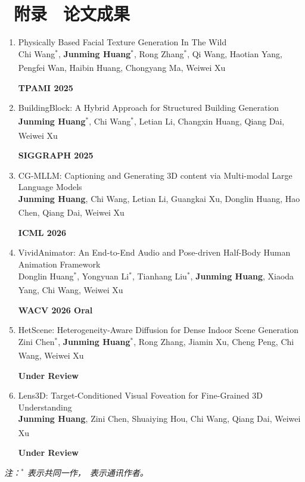 \documentclass{resume}
\newcommand{\paper}[3]{%
  \item
  \begin{minipage}[t]{0.805\linewidth}
    #1\\{\small #2}
  \end{minipage}%
  \hfill
  \begin{minipage}[t]{0.165\linewidth}
    \raggedleft\small\textbf{#3}
  \end{minipage}%
}
\begin{document}
\section{\faFileTextO\ 附录 \textperiodcentered\ 论文成果}
\begin{enumerate}[parsep=1.4ex]

  \paper{Physically Based Facial Texture Generation In The Wild}
  {Chi Wang$^{*}$, \textbf{Junming Huang}$^{*}$, Rong Zhang$^{*}$, Qi Wang, Haotian Yang, Pengfei Wan, Haibin Huang, Chongyang Ma, Weiwei Xu\textsuperscript{\Letter}}
  {TPAMI 2025}

  \paper{BuildingBlock: A Hybrid Approach for Structured Building Generation}
  {\textbf{Junming Huang}$^{*}$, Chi Wang$^{*}$, Letian Li, Changxin Huang, Qiang Dai\textsuperscript{\Letter}, Weiwei Xu\textsuperscript{\Letter}}
  {SIGGRAPH 2025}

  \paper{CG-MLLM: Captioning and Generating 3D content via Multi-modal Large Language Models}
  {\textbf{Junming Huang}, Chi Wang, Letian Li, Guangkai Xu, Donglin Huang, Hao Chen, Qiang Dai, Weiwei Xu\textsuperscript{\Letter}}
  {ICML 2026}

  \paper{VividAnimator: An End-to-End Audio and Pose-driven Half-Body Human Animation Framework}
  {Donglin Huang$^{*}$, Yongyuan Li$^{*}$, Tianhang Liu$^{*}$, \textbf{Junming Huang}, Xiaoda Yang, Chi Wang, Weiwei Xu\textsuperscript{\Letter}}
  {WACV 2026 Oral}

  \paper{HetScene: Heterogeneity-Aware Diffusion for Dense Indoor Scene Generation}
  {Zini Chen$^{*}$, \textbf{Junming Huang}$^{*}$, Rong Zhang, Jiamin Xu, Cheng Peng, Chi Wang\textsuperscript{\Letter}, Weiwei Xu}
  {Under Review}

  \paper{Lens3D: Target-Conditioned Visual Foveation for Fine-Grained 3D Understanding}
  {\textbf{Junming Huang}, Zini Chen, Shuaiying Hou, Chi Wang, Qiang Dai, Weiwei Xu\textsuperscript{\Letter}}
  {Under Review}
\end{enumerate}
{\small \textit{注：$^{*}$ 表示共同一作，\Letter\ 表示通讯作者。}}
\end{document}
